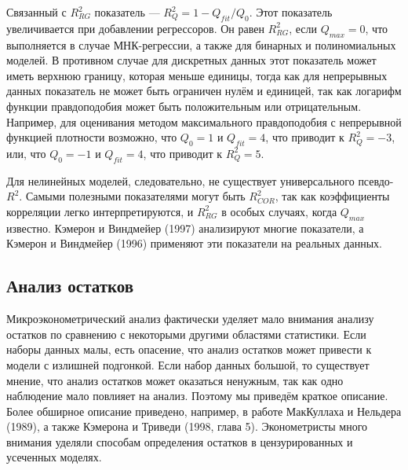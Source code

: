 Связанный с $R_{RG}^2$ показатель --- $R_{Q}^2 = 1 - Q_{fit}/Q_0$. Этот показатель увеличивается при добавлении регрессоров. Он равен $R_{RG}^2$, если $Q_{max} = 0$, что выполняется в случае МНК-регрессии, а также для бинарных и полиномиальных моделей. В противном случае для дискретных данных этот показатель может иметь верхнюю границу, которая меньше единицы, тогда как для непрерывных данных показатель не может быть ограничен нулём и единицей, так как логарифм функции правдоподобия может быть положительным или отрицательным. Например, для оценивания методом максимального правдоподобия с непрерывной функцией плотности возможно, что $Q_0 = 1$ и $Q_{fit} = 4$, что приводит к $R_Q^2 = -3$, или, что $Q_0 = - 1$ и $Q_{fit} = 4$, что приводит к $R_Q^2 = 5$.

Для нелинейных моделей, следовательно, не существует универсального псевдо-$R^2$. Самыми полезными показателями могут быть $R_{COR}^2$, так как коэффициенты корреляции легко интерпретируются, и $R_{RG}^2$ в особых случаях, когда $Q_{max}$ известно. Кэмерон и Виндмейер (1997) анализируют многие показатели, а Кэмерон и Виндмейер (1996) применяют эти показатели на реальных данных.

\subsection{Анализ остатков}

Микроэконометрический анализ фактически уделяет мало внимания анализу остатков по сравнению с некоторыми другими областями статистики. Если наборы данных малы, есть опасение, что анализ остатков может привести к модели с излишней подгонкой. Если набор данных большой, то существует мнение, что анализ остатков может оказаться ненужным, так как одно наблюдение мало повлияет на анализ. Поэтому мы приведём краткое описание. Более обширное описание приведено, например, в работе МакКуллаха и Нельдера (1989), а также Кэмерона и Триведи (1998, глава 5). Эконометристы много внимания уделяли способам  определения остатков в цензурированных и усеченных моделях.

